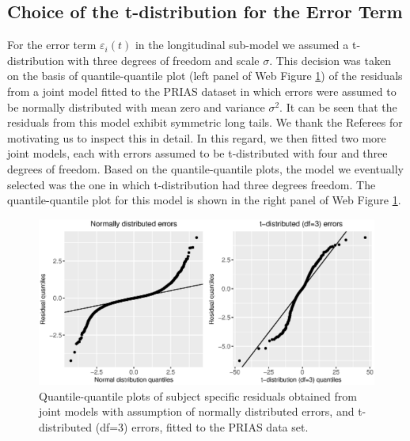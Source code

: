 \subsection{Choice of the t-distribution for the Error Term}
\label{subsec : t_dist_choice}
For the error term $\varepsilon_i(t)$ in the longitudinal sub-model we assumed a t-distribution with three degrees of freedom and scale $\sigma$. This decision was taken on the basis of quantile-quantile plot (left panel of Web Figure \ref{fig : qqplot_norm_t3_web}) of the residuals from a joint model fitted to the PRIAS dataset in which errors were assumed to be normally distributed with mean zero and variance $\sigma^2$. It can be seen that the residuals from this model exhibit symmetric long tails. We thank the Referees for motivating us to inspect this in detail. In this regard, we then fitted two more joint models, each with errors assumed to be t-distributed with four and three degrees of freedom. Based on the quantile-quantile plots, the model we eventually selected was the one in which t-distribution had three degrees freedom. The quantile-quantile plot for this model is shown in the right panel of Web Figure \ref{fig : qqplot_norm_t3_web}.

\begin{figure}[!htb]
\centerline{\includegraphics[width=\columnwidth]{images/model_fit/qqplot_norm_t3.eps}}
\caption{Quantile-quantile plots of subject specific residuals obtained from joint models with assumption of normally distributed errors, and t-distributed (df=3) errors, fitted to the PRIAS data set.}
\label{fig : qqplot_norm_t3_web}
\end{figure}

\clearpage

